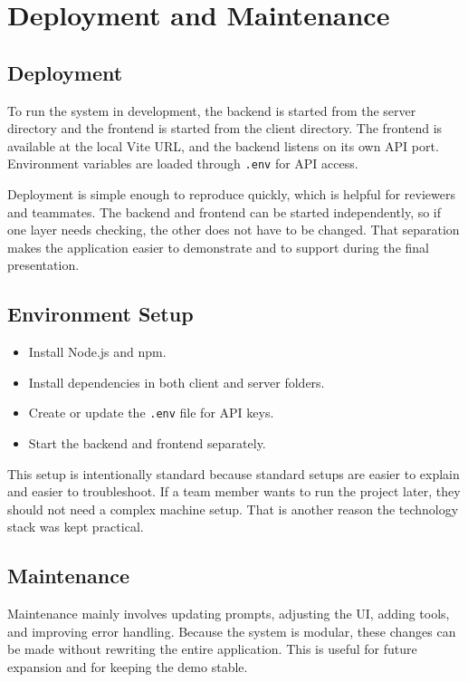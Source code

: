\documentclass[11pt,oneside]{report}
\begin{document}
\chapter{Deployment and Maintenance}
\section{Deployment}
To run the system in development, the backend is started from the server directory and the frontend is started from the client directory. The frontend is available at the local Vite URL, and the backend listens on its own API port. Environment variables are loaded through \texttt{.env} for API access.

Deployment is simple enough to reproduce quickly, which is helpful for reviewers and teammates. The backend and frontend can be started independently, so if one layer needs checking, the other does not have to be changed. That separation makes the application easier to demonstrate and to support during the final presentation.

\section{Environment Setup}
\begin{itemize}[leftmargin=1.2cm]
  \item Install Node.js and npm.
  \item Install dependencies in both client and server folders.
  \item Create or update the \texttt{.env} file for API keys.
  \item Start the backend and frontend separately.
\end{itemize}

This setup is intentionally standard because standard setups are easier to explain and easier to troubleshoot. If a team member wants to run the project later, they should not need a complex machine setup. That is another reason the technology stack was kept practical.

\section{Maintenance}
Maintenance mainly involves updating prompts, adjusting the UI, adding tools, and improving error handling. Because the system is modular, these changes can be made without rewriting the entire application. This is useful for future expansion and for keeping the demo stable.
\end{document}
